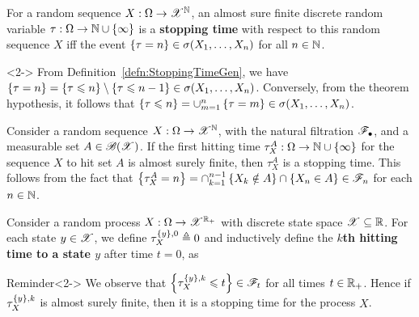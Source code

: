 \documentclass[12pt,aspectratio=169]{beamer}
\begin{document}
\begin{frame}
\begin{prop} 
For a random sequence $X: \Omega \to \mathscr{X}^{\mathbb{N}}$, 
an almost sure finite discrete random variable $\tau: \Omega \to \mathbb{N}\cup\left\{\infty\right\}$ is a \textbf{stopping time} with respect to this random sequence $X$ iff the event $\left\{\tau = n\right\} \in \sigma(X_1, \dots, X_n)$ for all $n \in \mathbb{N}$. 
\end{prop}
\begin{Proof}<2->
From Definition~\ref{defn:StoppingTimeGen}, 
we have $\left\{\tau = n\right\} = \left\{\tau \leqslant n\right\}\setminus\left\{\tau \leqslant n-1\right\} \in \sigma(X_1, \dots, X_n)$. 
Conversely, from the theorem hypothesis, it follows that $\left\{\tau \leqslant n\right\} = \cup_{m=1}^n\left\{\tau = m\right\} \in \sigma(X_1, \dots, X_n)$. 
\end{Proof}
\end{frame}


\begin{frame}
\begin{Example} 
Consider a random sequence $X: \Omega \to \mathscr{X}^{\mathbb{N}}$, 
with the natural filtration $\mathscr{F}_\bullet$,   
and a measurable set $A \in \mathscr{B}(\mathscr{X})$. 
If the first hitting time $\tau_X^A:\Omega\to\mathbb{N}\cup\left\{\infty\right\}$ for the sequence $X$ to hit set $A$ is 
almost surely finite, then $\tau_X^A$ is a stopping time. 
This follows from the fact that $\left\{\tau_X^A = n\right\} = \cap_{k=1}^{n-1}\left\{X_k \notin A\right\}\cap\left\{X_n \in A\right\} \in \mathscr{F}_n$ for each $n \in \mathbb{N}$. 
\end{Example}
\end{frame}

\begin{frame}
\begin{Definition} 
Consider a random process $X:\Omega\to \mathscr{X}^{\mathbb{R}_+}$ with discrete state space $\mathscr{X}\subseteq\mathbb{R}$. 
For each state $y \in \mathscr{X}$, we define $\tau_X^{\left\{y\right\},0} \triangleq 0$ and inductively define the \textbf{$k$th hitting time to a state $y$} after time $t = 0$, as 
\end{Definition}
\begin{block}{Reminder}<2->
We observe that $\left\{\tau_X^{\left\{y\right\}, k} \leqslant t\right\} \in \mathscr{F}_t$ for all times $t \in \mathbb{R}_+$. 
Hence if $\tau_X^{\left\{y\right\}, k}$ is almost surely finite, then it is a stopping time for the process $X$. 
\end{block}
\end{frame}
\end{document}
